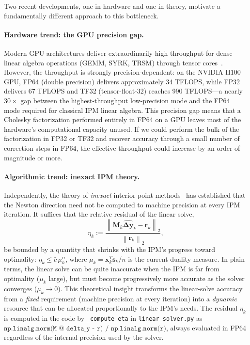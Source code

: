 \documentclass[11pt,twoside]{article}
\newcommand{\bx}{\mathbf{x}}
\newcommand{\by}{\mathbf{y}}
\newcommand{\bs}{\mathbf{s}}
\newcommand{\bM}{\mathbf{M}}
\newcommand{\br}{\mathbf{r}}
\newcommand{\bDelta}{\mathbf{\Delta}}
\newcommand{\norm}[1]{\left\lVert#1\right\rVert}
\begin{document}
Two recent developments, one in hardware and one in theory, motivate a
fundamentally different approach to this bottleneck.

\paragraph{Hardware trend: the GPU precision gap.}
Modern GPU architectures deliver extraordinarily high throughput for
dense linear algebra operations (GEMM, SYRK, TRSM) through tensor
cores~\cite{NVIDIA2023}.  However, the throughput is strongly
precision-dependent: on the NVIDIA H100 GPU, FP64 (double precision)
delivers approximately 34 TFLOPS, while FP32 delivers 67 TFLOPS and TF32
(tensor-float-32) reaches 990 TFLOPS---a nearly $30\times$ gap between
the highest-throughput low-precision mode and the FP64 mode required for
classical IPM linear algebra.  This precision gap means that a Cholesky
factorization performed entirely in FP64 on a GPU leaves most of the
hardware's computational capacity unused.  If we could perform the bulk
of the factorization in FP32 or TF32 and recover accuracy through a small
number of correction steps in FP64, the effective throughput could
increase by an order of magnitude or more.

\paragraph{Algorithmic trend: inexact IPM theory.}
Independently, the theory of \emph{inexact} interior point
methods~\cite{Bellavia1998,Monteiro2003} has established that the Newton
direction need not be computed to machine precision at every IPM
iteration.  It suffices that the relative residual of the linear solve,
\begin{equation}
  \eta_k := \frac{\norm{\bM_k\widehat{\bDelta\by}_k - \br_k}_2}
                   {\norm{\br_k}_2},
  \label{eq:eta-def-intro}
\end{equation}
be bounded by a quantity that shrinks with the IPM's progress toward
optimality: $\eta_k \le \bar{c}\,\mu_k^\alpha$, where $\mu_k =
\bx_k^T\bs_k / n$ is the current duality measure.  In plain terms, the
linear solve can be quite inaccurate when the IPM is far from optimality
($\mu_k$ large), but must become progressively more accurate as the
solver converges ($\mu_k \to 0$).  This theoretical insight transforms
the linear-solve accuracy from a \emph{fixed} requirement (machine
precision at every iteration) into a \emph{dynamic} resource that can be
allocated proportionally to the IPM's needs.  The residual $\eta_k$ is
computed in the code by \texttt{\_compute\_eta} in
\texttt{linear\_solver.py} as $\texttt{np.linalg.norm(M @ delta\_y -
r) / np.linalg.norm(r)}$, always evaluated in FP64 regardless of the
internal precision used by the solver.
\end{document}
